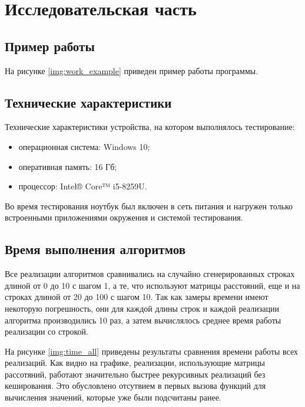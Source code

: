 \chapter{Исследовательская часть}

\section{Пример работы}

На рисунке \ref{img:work_example} приведен пример работы программы.


\section{Технические характеристики}

Технические характеристики устройства, на котором выполнялось тестирование:

\begin{itemize}
	\item операционная система: Windows 10;
	\item оперативная память: 16 Гб;
	\item процессор: Intel® Core™ i5-8259U.
\end{itemize}

Во время тестирования ноутбук был включен в сеть питания и нагружен только встроенными приложениями окружения и системой тестирования.

\section{Время выполнения алгоритмов}

 Все реализации алгоритмов сравнивались на случайно сгенерированных строках длиной от 0 до 10 с шагом 1, а те, что используют матрицы расстояний, еще и на строках длиной от 20 до 100 с шагом 10. Так как замеры времени имеют некоторую погрешность, они для каждой длины строк и каждой реализации алгоритма производились 10 раз, а затем вычислялось среднее время работы реализации со строкой.
 
На рисунке \ref{img:time_all} приведены результаты сравнения времени работы всех реализаций. Как видно на графике, реализации, использующие матрицы рассотяний, работают значительно быстрее рекурсивных реализаций без кеширования. Это обусловлено отсутвием в первых вызова функций для вычисления значений, которые уже были подсчитаны ранее.

